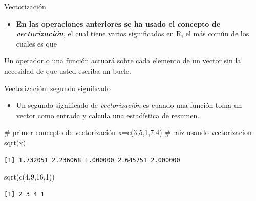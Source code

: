 \documentclass[
  ignorenonframetext,
  aspectratio=169,
  spanish,
]{beamer}
\newenvironment{Shaded}{\begin{snugshade}}{\end{snugshade}}
\newcommand{\CommentTok}[1]{\textcolor[rgb]{0.37,0.37,0.37}{#1}}
\newcommand{\DecValTok}[1]{\textcolor[rgb]{0.68,0.00,0.00}{#1}}
\newcommand{\FunctionTok}[1]{\textcolor[rgb]{0.28,0.35,0.67}{#1}}
\newcommand{\NormalTok}[1]{\textcolor[rgb]{0.00,0.23,0.31}{#1}}
\newcommand{\OtherTok}[1]{\textcolor[rgb]{0.00,0.23,0.31}{#1}}
\providecommand{\tightlist}{%
  \setlength{\itemsep}{0pt}\setlength{\parskip}{0pt}}
\begin{document}
\begin{frame}{Vectorización}
\label{vectorizaciuxf3n}
\begin{itemize}
\tightlist
\item
  \textbf{En las operaciones anteriores se ha usado el concepto de
  \emph{vectorización}}, el cual tiene varios significados en R, el más
  común de los cuales es que
\end{itemize}

\begin{tcolorbox}[enhanced jigsaw, leftrule=.75mm, opacitybacktitle=0.6, opacityback=0, coltitle=black, breakable, colbacktitle=quarto-callout-important-color!10!white, colback=white, titlerule=0mm, bottomrule=.15mm, left=2mm, bottomtitle=1mm, colframe=quarto-callout-important-color-frame, toptitle=1mm, toprule=.15mm, title=\textcolor{quarto-callout-important-color}{\faExclamation}\hspace{0.5em}{Importante}, arc=.35mm, rightrule=.15mm]

Un operador o una función actuará sobre cada elemento de un vector sin
la necesidad de que usted escriba un bucle.

\end{tcolorbox}
\end{frame}

\begin{frame}[fragile]{Vectorización: segundo significado}
\label{vectorizaciuxf3n-segundo-significado}
\begin{itemize}
\tightlist
\item
  Un segundo significado de \emph{vectorización} es cuando una función
  toma un vector como entrada y calcula una estadística de resumen.
\end{itemize}

\begin{Shaded}
\begin{Highlighting}[]
\CommentTok{\# primer concepto de vectorización}
\NormalTok{x}\OtherTok{=}\FunctionTok{c}\NormalTok{(}\DecValTok{3}\NormalTok{,}\DecValTok{5}\NormalTok{,}\DecValTok{1}\NormalTok{,}\DecValTok{7}\NormalTok{,}\DecValTok{4}\NormalTok{) }
\CommentTok{\# raiz usando vectorizacion}
\FunctionTok{sqrt}\NormalTok{(x)}
\end{Highlighting}
\end{Shaded}

\begin{verbatim}
[1] 1.732051 2.236068 1.000000 2.645751 2.000000
\end{verbatim}

\begin{Shaded}
\begin{Highlighting}[]
\FunctionTok{sqrt}\NormalTok{(}\FunctionTok{c}\NormalTok{(}\DecValTok{4}\NormalTok{,}\DecValTok{9}\NormalTok{,}\DecValTok{16}\NormalTok{,}\DecValTok{1}\NormalTok{)) }
\end{Highlighting}
\end{Shaded}

\begin{verbatim}
[1] 2 3 4 1
\end{verbatim}
\end{frame}
\end{document}
